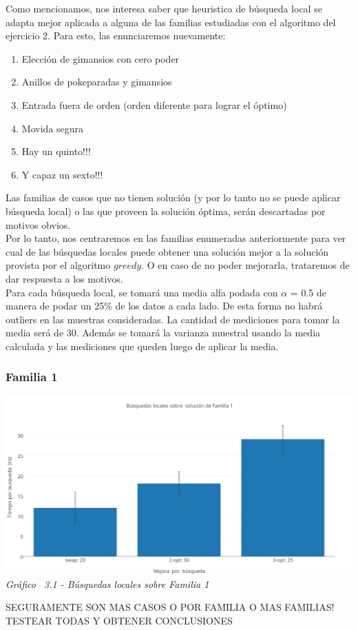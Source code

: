 Como mencionamos, nos interesa saber que heuristica de búsqueda local se adapta mejor aplicada a alguna de las familias estudiadas con el algoritmo del ejercicio 2. Para esto, las enunciaremos nuevamente:

\begin{enumerate}
\item Elección de gimansios con cero poder 
\item Anillos de pokeparadas y gimansios
\item Entrada fuera de orden (orden diferente para lograr el óptimo)
\item Movida segura
\item Hay un quinto!!!
\item Y capaz un sexto!!!
\end{enumerate}

Las familias de casos que no tienen solución (y por lo tanto no se puede aplicar búsqueda local) o las que proveen la solución óptima, serán descartadas por motivos obvios.\\
Por lo tanto, nos centraremos en las familias enumeradas anteriormente para ver cual de las búsquedas locales puede obtener una solución mejor a la solución provista por el algoritmo $greedy$. O en caso de no poder mejorarla, trataremos de dar respuesta a los motivos.\\

Para cada búsqueda local, se tomará una media alfa podada con $\alpha$ = 0.5 de manera de podar un 25\% de los datos a cada lado. De esta forma no habrá outliers en las muestras consideradas. 
La cantidad de mediciones para tomar la media será de 30. Además se tomará la varianza muestral usando la media calculada y las mediciones que queden luego de aplicar la media.\\

\subsubsection*{Familia 1}

\vspace*{0.3cm} \vspace*{0.3cm}
  \begin{center}
 \includegraphics[scale=0.5]{./EJ3/local_search_familia.png}
 {            \textit{Gráfico \ 3.1 - Búsquedas locales sobre Familia 1}}
  \end{center}
  \vspace*{0.3cm}
  
SEGURAMENTE SON MAS CASOS O POR FAMILIA O MAS FAMILIAS! TESTEAR TODAS Y OBTENER CONCLUSIONES
